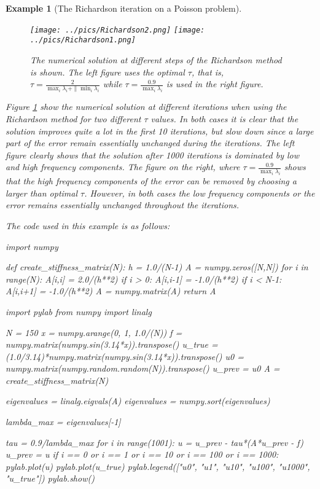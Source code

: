 \documentclass[a4paper,11pt]{amsart}
\newtheorem{example}{Example}[section]
\begin{document}
\begin{example}[The Richardson iteration on a Poisson problem]
\begin{figure}[h]
\begin{center}
\label{Poisson1D:Rich}
\texttt{[image: ../pics/Richardson2.png]}
\texttt{[image: ../pics/Richardson1.png]}
\caption{The numerical solution at different steps of the Richardson method is
shown. The left figure uses
the optimal $\tau$,  that is, $\tau = \frac{2}{\max_i \lambda_i + \|\min_i \lambda_i}$
while $\tau = \frac{0.9}{\max_i \lambda_i}$ is used in the right figure.
}
\end{center}
\end{figure}
Figure \ref{Poisson1D:Rich} show the numerical solution at different iterations when
using the Richardson method for two different $\tau$ values. In both cases
it is clear that the solution improves quite a lot in the first 10 iterations, but
slow down since a large part of the error remain essentially unchanged during the iterations. 
The left figure clearly shows that the solution after 1000 iterations
is dominated by low and high frequency components. The figure on the right,
where $\tau = \frac{0.9}{\max_i \lambda_i}$ shows that the high frequency components
of the error can be removed by choosing a larger than optimal $\tau$.
However, in both cases the low frequency components or the error remains essentially
unchanged throughout the iterations.

The code used in this example is as follows: 
\begin{python}
import numpy

def create_stiffness_matrix(N):
  h = 1.0/(N-1)
  A = numpy.zeros([N,N])
  for i in range(N):
    A[i,i] = 2.0/(h**2)
    if i > 0:
      A[i,i-1] = -1.0/(h**2)
    if i < N-1:
      A[i,i+1] = -1.0/(h**2)
  A = numpy.matrix(A)
  return A

import pylab
from numpy import linalg

N = 150
x = numpy.arange(0, 1, 1.0/(N))
f = numpy.matrix(numpy.sin(3.14*x)).transpose()
u_true = (1.0/3.14)*numpy.matrix(numpy.sin(3.14*x)).transpose()
u0 = numpy.matrix(numpy.random.random(N)).transpose()
u_prev = u0
A = create_stiffness_matrix(N)

eigenvalues = linalg.eigvals(A)
eigenvalues = numpy.sort(eigenvalues)

lambda_max = eigenvalues[-1]

tau = 0.9/lambda_max
for i in range(1001):
  u = u_prev - tau*(A*u_prev - f)
  u_prev = u
  if i == 0 or i == 1 or i == 10 or i == 100 or i == 1000:
    pylab.plot(u)
pylab.plot(u_true)
pylab.legend(["u0", "u1", "u10", "u100", "u1000", "u_true"])
pylab.show()
\end{python}
\end{example}
\end{document}
